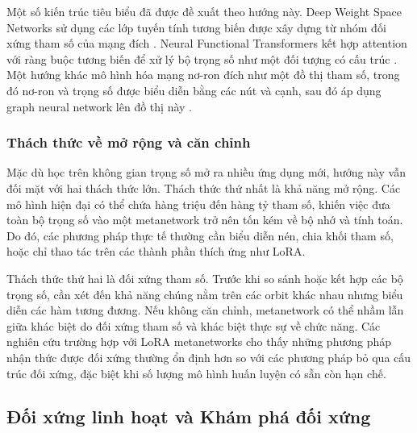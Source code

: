 Một số kiến trúc tiêu biểu đã được đề xuất theo hướng này. Deep Weight Space Networks sử dụng các lớp tuyến tính tương biến được xây dựng từ nhóm đối xứng tham số của mạng đích \cite{navon2023equivariant}. Neural Functional Transformers kết hợp attention với ràng buộc tương biến để xử lý bộ trọng số như một đối tượng có cấu trúc \cite{zhou2024neural}. Một hướng khác mô hình hóa mạng nơ-ron đích như một đồ thị tham số, trong đó nơ-ron và trọng số được biểu diễn bằng các nút và cạnh, sau đó áp dụng graph neural network lên đồ thị này \cite{lim2023graph}.

\subsubsection{Thách thức về mở rộng và căn chỉnh}

Mặc dù học trên không gian trọng số mở ra nhiều ứng dụng mới, hướng này vẫn đối mặt với hai thách thức lớn. Thách thức thứ nhất là khả năng mở rộng. Các mô hình hiện đại có thể chứa hàng triệu đến hàng tỷ tham số, khiến việc đưa toàn bộ trọng số vào một metanetwork trở nên tốn kém về bộ nhớ và tính toán. Do đó, các phương pháp thực tế thường cần biểu diễn nén, chia khối tham số, hoặc chỉ thao tác trên các thành phần thích ứng như LoRA.

Thách thức thứ hai là đối xứng tham số. Trước khi so sánh hoặc kết hợp các bộ trọng số, cần xét đến khả năng chúng nằm trên các orbit khác nhau nhưng biểu diễn các hàm tương đương. Nếu không căn chỉnh, metanetwork có thể nhầm lẫn giữa khác biệt do đối xứng tham số và khác biệt thực sự về chức năng. Các nghiên cứu trường hợp với LoRA metanetworks cho thấy những phương pháp nhận thức được đối xứng thường ổn định hơn so với các phương pháp bỏ qua cấu trúc đối xứng, đặc biệt khi số lượng mô hình huấn luyện có sẵn còn hạn chế.



\subsection{Đối xứng linh hoạt và Khám phá đối xứng}
\label{subsec:flexible-symmetries}


